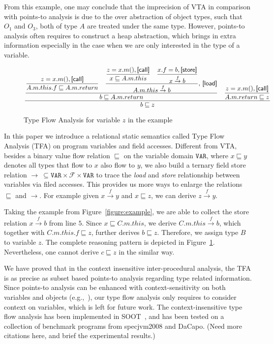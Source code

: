 \documentclass{llncs}
\newcommand\Var{\mathtt{VAR}}
\newcommand{\Field}{\mathcal{F}}
\newcommand{\less}{\sqsubseteq}
\newcommand{\hflow}{\rightarrow}
\newcommand{\lhflow}[1]{\stackrel{#1}{\hflow}}
\begin{document}
From this example, one may conclude that the imprecision of VTA in comparison with points-to analysis is due to the over abstraction of object types, such that $O_1$ and $O_3$, both of type $A$ are treated under the same type. However, points-to analysis often requires to construct a heap abstraction, which brings in extra information especially in the case when we are only interested in the type of a variable.

\begin{figure}[t!]
\[\dfrac{\dfrac{\dfrac{z=x.m(), \mbox{\textsf{[call]}}}{A.m.this.f\less A.m.return}\quad
  \dfrac{\dfrac{z=x.m(), \mbox{\textsf{[call]}}}{x\less A.m.this}\quad\dfrac{x.f=b, \mbox{\textsf{[store]}}}{x\lhflow{f}b}}
  {A.m.this\lhflow{f}b}\mbox{, \textsf{[load]}}}{b\less A.m.return}\quad
  \dfrac{z=x.m(), \mbox{\textsf{[call]}}}{A.m.return\less z}}{b\less z}\]
\caption{Type Flow Analysis for variable $z$ in the example}\label{fig:tfa}
\end{figure}

In this paper we introduce a relational static semantics called Type Flow Analysis (TFA) on program variables and field accesses. Different from VTA, besides a binary value flow relation $\less$ on the variable domain $\Var$, where $x\less y$ denotes all types that flow to $x$ also flow to $y$, we also build a ternary field store relation $\rightarrow\ \subseteq\Var\times\Field\times\Var$ to trace the \emph{load} and \emph{store} relationship between variables via filed accesses. This provides us more ways to enlarge the relations $\less$ and $\rightarrow$. For example given $x\lhflow{f}y$ and $x\less z$, we can derive $z\lhflow{f}y$.

Taking the example from Figure~\ref{figure:example}, we are able to collect the store relation $x\lhflow{f}b$ from line $5$. Since $x\less C.m.this$, we derive $C.m.this\lhflow{f}b$, which together with $C.m.this.f\less z$, further derives $b\less z$. Therefore, we assign type $B$ to variable $z$. The complete reasoning pattern is depicted in Figure~\ref{fig:tfa}. Nevertheless, one cannot derive $c\less z$ in the similar way.

We have proved that in the context insensitive inter-procedural analysis, the TFA is as precise as subset based points-to analysis regarding type related information. Since points-to analysis can be enhanced with context-sensitivity on both variables and objects (e.g.,~\cite{Milanova2005,Smaragdakis11,Tan16}), our type flow analysis only requires to consider context on variables, which is left for future work. The context-insensitive type flow analysis has been implemented in SOOT~\cite{soot}, and has been tested on a collection of benchmark programs from specjvm2008 and DaCapo. (Need more citations here, and brief the experimental results.)
\end{document}
